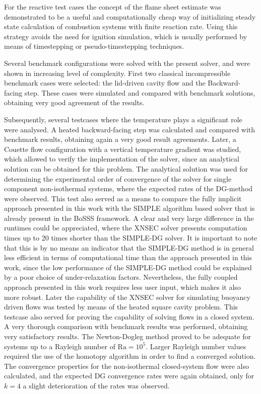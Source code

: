 For the reactive test cases the concept of the flame sheet estimate was demonstrated to be a useful and computationally cheap way of initializing steady state calculation of combustion systems with finite reaction rate. Using this strategy avoids the need for ignition simulation, which is usually performed by means of timestepping or pseudo-timestepping techniques.

Several benchmark configurations were solved with the present solver, and were shown in increasing level of complexity. First two classical incompressible benchmark cases were selected: the lid-driven cavity flow and the Backward-facing step. These cases were simulated and compared with benchmark solutions, obtaining very good agreement of the results. 

Subsequently, several testcases where the temperature plays a significant role were analysed. A heated backward-facing step was calculated and compared with benchmark results, obtaining again a very good result agreements. Later, a Couette flow configuration with a vertical temperature gradient was studied, which allowed to verify the implementation of the solver, since an analytical solution can be obtained for this problem. The analytical solution was used for determining the experimental order of convergence of the solver for single component non-isothermal systems, where the expected rates of the DG-method were observed. This test also served as a means to compare the fully implicit approach presented in this work with the SIMPLE algorithm based solver that is already present in the BoSSS framework. A clear and very large difference in the runtimes could be appreciated, where the XNSEC solver presents computation times up to 20 times shorter than the SIMPLE-DG solver. It is important to note that this is by no means an indicator that the SIMPLE-DG method is in general less efficient in terms of computational time than the approach presented in this work, since the low performance of the SIMPLE-DG method could be explained by a poor choice of under-relaxation factors. Nevertheless, the fully coupled approach presented in this work requires less user input, which makes it also more robust. Later the capability of the XNSEC solver for simulating buoyancy driven flows was tested by means of the heated square cavity problem. This testcase also served for proving the capability of solving flows in a closed system. A very thorough comparison with benchmark results was performed, obtaining very satisfactory results. The Newton-Dogleg method proved to be adequate for systems up to a Rayleigh number of $\text{Ra} = 10^5$. Larger Rayleigh number values required the use of the homotopy algorithm in order to find a converged solution. The convergence properties for the non-isothermal closed-system flow were also calculated, and the expected DG convergence rates were again obtained, only for $k=4$ a slight deterioration of the rates was observed.
